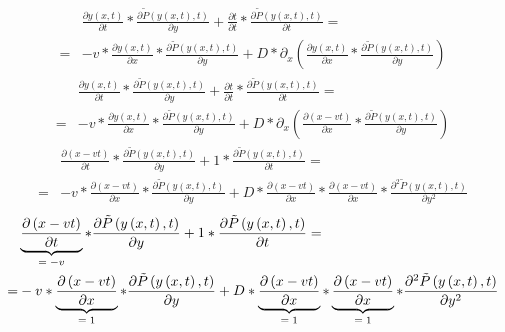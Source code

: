 \begin{align} \label{eq:27}
    &\frac{\partial y \left( x, t \right)}{\partial t} * \frac{\partial \tilde{P} \left( y \left( x, t \right), t \right)}{\partial y}
    +
    \frac{\partial t}{\partial t} * \frac{\partial \tilde{P} \left( y \left( x, t \right), t \right)}{\partial t}
    = \nonumber \\
    =&
    -
    v * \frac{\partial y \left( x, t \right)}{\partial x} * \frac{\partial \tilde{P} \left( y \left( x, t \right), t \right)}{\partial y}
    +
    D * \partial_{x} \left( \frac{\partial y \left( x, t \right)}{\partial x} * \frac{\partial \tilde{P} \left( y \left( x, t \right), t \right)}{\partial y} \right)
\end{align}
\hrulefill
\begin{align} \label{eq:28}
    &\frac{\partial y \left( x, t \right)}{\partial t} * \frac{\partial \tilde{P} \left( y \left( x, t \right), t \right)}{\partial y}
    +
    \frac{\partial t}{\partial t} * \frac{\partial \tilde{P} \left( y \left( x, t \right), t \right)}{\partial t}
    = \nonumber \\
    =&
    -
    v * \frac{\partial y \left( x, t \right)}{\partial x} * \frac{\partial \tilde{P} \left( y \left( x, t \right), t \right)}{\partial y}
    +
    D * \partial_{x} \left( \frac{\partial \left( x - vt \right)}{\partial x} * \frac{\partial \tilde{P} \left( y \left( x, t \right), t \right)}{\partial y} \right)
\end{align}
\hrulefill
\begin{align} \label{eq:29}
    &\frac{\partial \left( x - vt \right)}{\partial t} * \frac{\partial \tilde{P} \left( y \left( x, t \right), t \right)}{\partial y}
    +
    1 * \frac{\partial \tilde{P} \left( y \left( x, t \right), t \right)}{\partial t}
    = \nonumber \\
    =&
    -
    v * \frac{\partial \left( x - vt \right)}{\partial x} * \frac{\partial \tilde{P} \left( y \left( x, t \right), t \right)}{\partial y}
    +
    D * \frac{\partial \left( x - vt \right)}{\partial x} * \frac{\partial \left( x - vt \right)}{\partial x} * \frac{\partial^{2} \tilde{P} \left( y \left( x, t \right), t \right)}{\partial y^{2}}
\end{align}
\hrulefill
\begin{align} \label{eq:30}
    &\underbrace{\frac{\partial \left( x - vt \right)}{\partial t}}_{\text{\normalfont $= -v$}} * \frac{\partial \tilde{P} \left( y \left( x, t \right), t \right)}{\partial y}
    +
    1 * \frac{\partial \tilde{P} \left( y \left( x, t \right), t \right)}{\partial t}
    = \nonumber \\
    =&
    -
    v * \underbrace{\frac{\partial \left( x - vt \right)}{\partial x}}_{\text{\normalfont $= 1$}} * \frac{\partial \tilde{P} \left( y \left( x, t \right), t \right)}{\partial y}
    +
    D * \underbrace{\frac{\partial \left( x - vt \right)}{\partial x}}_{\text{\normalfont $= 1$}} * \underbrace{\frac{\partial \left( x - vt \right)}{\partial x}}_{\text{\normalfont $= 1$}} * \frac{\partial^{2} \tilde{P} \left( y \left( x, t \right), t \right)}{\partial y^{2}}
\end{align}
